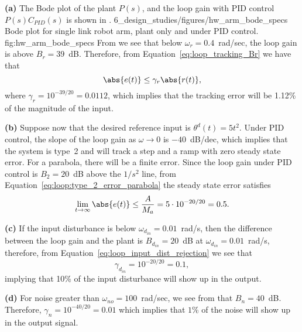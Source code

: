 {\bf (a)} The Bode plot of the plant $P(s)$, and the loop gain with PID control $P(s)C_{PID}(s)$ is shown in .
	{6_design_studies/figures/hw_arm_bode_specs}
	{Bode plot for single link robot arm, plant only and under PID control.}
	{fig:hw_arm_bode_specs}
From  we see that below $\omega_r = 0.4$~rad/sec, the loop gain is above $B_r=39$~dB.  Therefore, from Equation~\eqref{eq:loop_tracking_Br} we have that
\[
\abs{e(t)} \leq \gamma_r \abs{r(t)},
\]
where $\gamma_r = 10^{-39/20} = 0.0112$, which implies that the tracking error will be 1.12\% of the magnitude of the input.


{\bf (b)} Suppose now that the desired reference input is $\theta^d(t) = 5t^2$.  Under PID control, the slope of the loop gain as $\omega\to 0$ is $-40$~dB/dec, which implies that the system is type~2 and will track a step and a ramp with zero steady state error.  For a parabola, there will be a finite error.  Since the loop gain under PID control is $B_2=20$~dB above the $1/s^2$ line, from Equation~\eqref{eq:loop:type_2_error_parabola} the steady state error satisfies
\[
\lim_{t\to\infty}\abs{e(t)} \leq \frac{A}{M_a}  = 5\cdot 10^{-20/20} = 0.5.
\]

{\bf (c)} If the input disturbance is below $\omega_{d_{in}} = 0.01$~rad/s, then the difference between the loop gain and the plant is $B_{d_{in}}=20$~dB at $\omega_{d_{in}} = 0.01$~rad/s, therefore, from Equation~\eqref{eq:loop_input_dist_rejection} we see that 
\[
\gamma_{d_{in}} = 10^{-20/20} = 0.1,
\]
implying that 10\% of the input disturbance will show up in the output.

{\bf (d)} For noise greater than $\omega_{no}=100$~rad/sec, we see from  that $B_n = 40$~dB.  Therefore, $\gamma_n = 10^{-40/20} = 0.01$ which implies that $1$\% of the noise will show up in the output signal.

